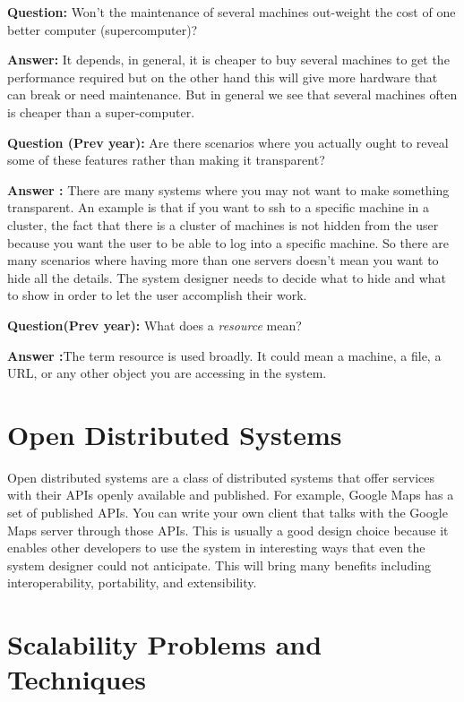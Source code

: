 \documentclass[twoside]{article}
\begin{document}
\textbf{Question:} Won't the maintenance of several machines out-weight the cost of one better computer (supercomputer)?

\textbf{Answer:} It depends, in general, it is cheaper to buy several machines to get the performance required but on the other hand this will give more hardware that can break or need maintenance. But in general we see that several machines often is cheaper than a super-computer. 


\textbf{Question (Prev year):} Are there scenarios where you actually ought to reveal some of these features rather than making it transparent?

\textbf{Answer :} There are many systems where you may not want to make something transparent. An example is that if you want to ssh to a specific machine in a cluster, the fact that there is a cluster of machines is not hidden from the user because you want the user to be able to log into a specific machine. So there are many scenarios where having more than one servers doesn't mean you want to hide all the details. The system designer needs to decide what to hide and what to show in order to let the user accomplish their work.

\textbf{Question(Prev year):} What does a \textit{resource} mean?

\textbf{Answer :}The term resource is used broadly. It could mean a machine, a file, a URL, or any other object you are accessing in the system.

\section{Open Distributed Systems}

Open distributed systems are a class of distributed systems that offer services with their APIs openly available and published. For example, Google Maps has a set of published APIs. You can write your own client that talks with the Google Maps server through those APIs. This is usually a good design choice because it enables other developers to use the system in interesting ways that even the system designer could not anticipate. This will bring many benefits including interoperability, portability, and extensibility.

\label{scalability-problems}
\section{Scalability Problems and Techniques}
\end{document}
